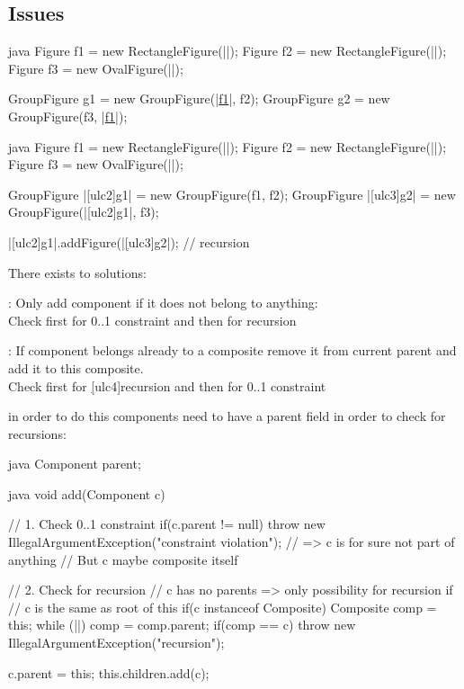 \subsection{Issues}
\begin{codeboxNl}[0..1 Constraint]{java}
  Figure f1 = new RectangleFigure(|\optldots|);
  Figure f2 = new RectangleFigure(|\optldots|);
  Figure f3 = new OvalFigure(|\optldots|);

  GroupFigure g1 = new GroupFigure(|\ul{f1}|, f2);
  GroupFigure g2 = new GroupFigure(f3, |\ul{f1}|);
\end{codeboxNl}
\begin{codeboxNl}[0..1 Constraint]{java}
  Figure f1 = new RectangleFigure(|\optldots|);
  Figure f2 = new RectangleFigure(|\optldots|);
  Figure f3 = new OvalFigure(|\optldots|);

  GroupFigure |\ul[ulc2]{g1}| = new GroupFigure(f1, f2);
  GroupFigure |\ul[ulc3]{g2}| = new GroupFigure(|\ul[ulc2]{g1}|, f3);

  |\ul[ulc2]{g1}|.addFigure(|\ul[ulc3]{g2}|);  // recursion
\end{codeboxNl}
\begin{sectionbox}[Solutions]\nospacing
  There exists to solutions:
  \begin{itemizenosep}
      \item {}: Only add component if it does not belong to anything:\\
      Check first for 0..1 constraint and then for recursion
      \item {}: If component belongs already to a composite remove it
      from current parent and add it to this composite.\\
      Check first for \ul[ulc4]{recursion} and then for 0..1 constraint
  \end{itemizenosep}
  in order to do this components need to have a parent field in order to check
  for recursions:
  \begin{mintlinebox}{java}
		Component parent;
  \end{mintlinebox}
\end{sectionbox}
\begin{codeboxNl}[Variant 1]{java}
void add(Component c) {
  // 1. Check 0..1 constraint
  if(c.parent != null) {
    throw new IllegalArgumentException("constraint violation");
  }
  // => c is for sure not part of anything
  // But c maybe composite itself 

  // 2. Check for recursion 
  // c has no parents => only possibility for recursion if
  // c is the same as root of this
  if(c instanceof Composite) {
    Composite comp = this;
    while (||) { comp = comp.parent; }
    if(comp == c) {
      throw new IllegalArgumentException("recursion");
    }
  }

  c.parent = this;
  this.children.add(c);
}
\end{codeboxNl}
